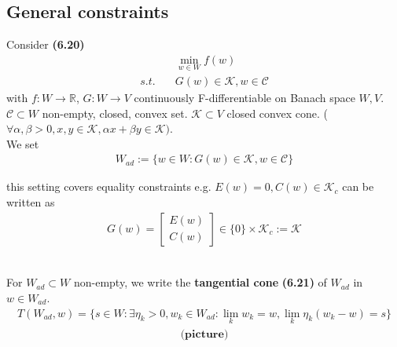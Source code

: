 \begin{theorem}
	
\end{theorem}


\subsection{General constraints}
Consider  \textbf{(6.20)}
\begin{align*}
	&\min_{w \in W} f(w) \\
	s.t.\quad &G(w) \in \mathcal{K}, w \in \mathcal{C} 
\end{align*}
with $f:W \rightarrow \mathbb{R}$, $G: W \rightarrow V$ continuously F-differentiable on Banach space $W, V$. $\mathcal{C} \subset W$ non-empty, closed, convex set. $\mathcal{K} \subset V$ closed convex cone. ($\forall \alpha, \beta > 0, x, y \in \mathcal{K}, \alpha x + \beta y \in \mathcal{K})$. \\
We set
\begin{align*}
	W_{ad}:= \{ w \in W: G(w) \in \mathcal{K}, w \in \mathcal{C}\}
\end{align*}
\begin{remark}
this setting covers equality constraints e.g. $E(w) = 0, C(w) \in \mathcal{K}_c$ can be written as 
\begin{align*}
	G(w) = 
	\begin{bmatrix}
		E(w)\\
		C(w)
	\end{bmatrix}
	\in  \{0\} \times \mathcal{K}_c:= \mathcal{K}
\end{align*}	
\end{remark}
\quad\\
For $W_{ad} \subset W$ non-empty, we write the \textbf{tangential cone} \textbf{(6.21)} of $W_{ad}$ in $w \in W_{ad}$.
\begin{align*}
	T(W_{ad}, w) = \{ s \in W: \exists \eta_k > 0, w_k \in W_{ad}: \lim_k w_k = w, \lim_k \eta_k(w_k - w) = s \}
\end{align*}
\begin{align*}
	\textbf{(picture)}
\end{align*}

